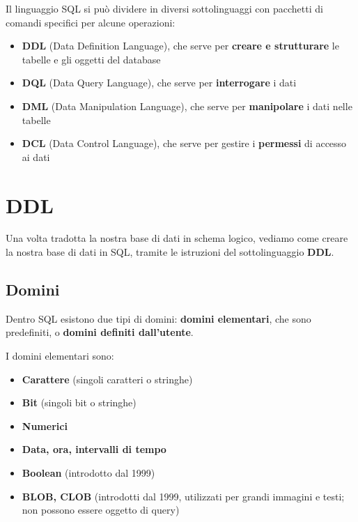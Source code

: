 \documentclass[11pt, a4paper, titlepage, oneside]{scrbook}
\begin{document}
Il linguaggio SQL si può dividere in diversi sottolinguaggi con pacchetti di comandi specifici per alcune operazioni:
\begin{itemize}
    \item \textbf{DDL} (Data Definition Language), che serve per \textbf{creare e strutturare} le tabelle e gli oggetti del database
    \item \textbf{DQL} (Data Query Language), che serve per \textbf{interrogare} i dati
    \item \textbf{DML} (Data Manipulation Language), che serve per \textbf{manipolare} i dati nelle tabelle
    \item \textbf{DCL} (Data Control Language), che serve per gestire i \textbf{permessi} di accesso ai dati
\end{itemize}

\section{DDL}

Una volta tradotta la nostra base di dati in schema logico, vediamo come creare la nostra base di dati in SQL, tramite le istruzioni del sottolinguaggio \textbf{DDL}.

\subsection*{Domini}

\begin{Definizione}[Domini]
\label{def-domini}
Dentro SQL esistono due tipi di domini: \textbf{domini elementari}, che sono predefiniti, o \textbf{domini definiti dall'utente}.
\end{Definizione}

I domini elementari sono:
\begin{itemize}
    \item \textbf{Carattere} (singoli caratteri o stringhe)
    \item \textbf{Bit} (singoli bit o stringhe)
    \item \textbf{Numerici}
    \item \textbf{Data, ora, intervalli di tempo}
    \item \textbf{Boolean} (introdotto dal 1999)
    \item \textbf{BLOB, CLOB} (introdotti dal 1999, utilizzati per grandi immagini e testi; non possono essere oggetto di query)
\end{itemize}
\end{document}
